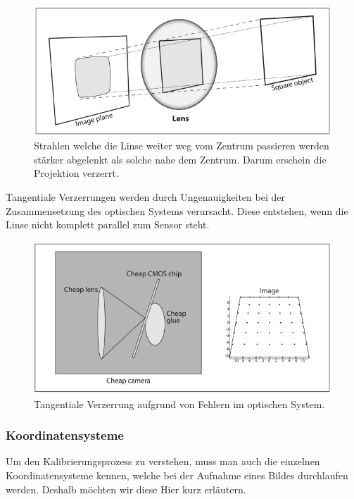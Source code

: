 \documentclass[main.tex]{subfiles}
\begin{document}
\begin{figure}[!ht]
\centering
\includegraphics[scale=0.5]{images/radial-disortion.png} 
\caption{Strahlen welche die Linse weiter weg vom Zentrum passieren werden stärker abgelenkt als solche nahe dem Zentrum. Darum erschein die Projektion verzerrt.\protect\cite{learningopencv}}
\label{fig:radial-disortion}
\end{figure}

Tangentiale Verzerrungen werden durch Ungenauigkeiten bei der Zusammensetzung des optischen Systems verursacht. Diese entstehen, wenn die Linse nicht komplett parallel zum Sensor steht.

\begin{figure}[!ht]
\centering
\includegraphics[scale=0.5]{images/tangential-disortion.png} 
\caption{Tangentiale Verzerrung aufgrund von Fehlern im optischen System.\protect\cite{learningopencv}}
\label{fig:tangential-disortion}
\end{figure}

\subsubsection{Koordinatensysteme}
Um den Kalibrierungsprozess zu verstehen, muss man auch die einzelnen Koordinatensysteme kennen, welche bei der Aufnahme eines Bildes durchlaufen werden. Deshalb möchten wir diese Hier kurz erläutern.
\end{document}
